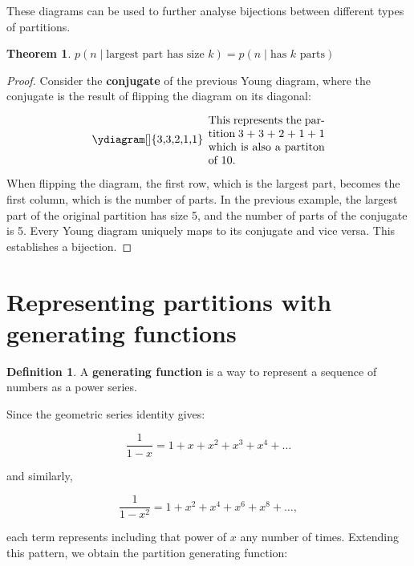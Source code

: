 \documentclass{article}
\theoremstyle{definition}
\newtheorem{definition}{Definition}
\newtheorem{theorem}{Theorem}
\begin{document}
\noindent
These diagrams can be used to further analyse bijections between different types of partitions.

\begin{theorem}
    $p(n \mid \text{largest part has size $k$}) = p(n \mid \text{has $k$ parts})$
\end{theorem}

\begin{proof}
Consider the \textbf{conjugate} of the previous Young diagram, where the conjugate is the result of
flipping the diagram on its diagonal:

\[
\begin{minipage}{0.3\textwidth}
    \ydiagram[]
        {3,3,2,1,1}
\end{minipage}
\begin{minipage}{0.3\textwidth}
    This represents the partition 3 + 3 + 2 + 1 + 1 which is also a partiton of 10.
\end{minipage}
\]

\noindent
When flipping the diagram, the first row, which is the largest part, becomes the first column, which is the
number of parts. In the previous example, the largest part of the original partition has size 5, and the number of
parts of the conjugate is 5.
\newline Every Young diagram uniquely maps to its conjugate and vice versa. This establishes a bijection.
\end{proof}

\section{Representing partitions with generating functions}

\begin{definition}
    A \textbf{generating function} is a way to represent a sequence of numbers as a power series. 
\end{definition}

\noindent
Since the geometric series identity gives:

\[
\frac{1}{1 - x} = 1 + x + x^2 + x^3 + x^4 + \dots
\]

\noindent
and similarly,

\[
\frac{1}{1 - x^2} = 1 + x^2 + x^4 + x^6 + x^8 + \dots,
\]

\noindent
each term represents including that power of \( x \) any number of times. Extending this pattern, we obtain
the partition generating function:
\end{document}
